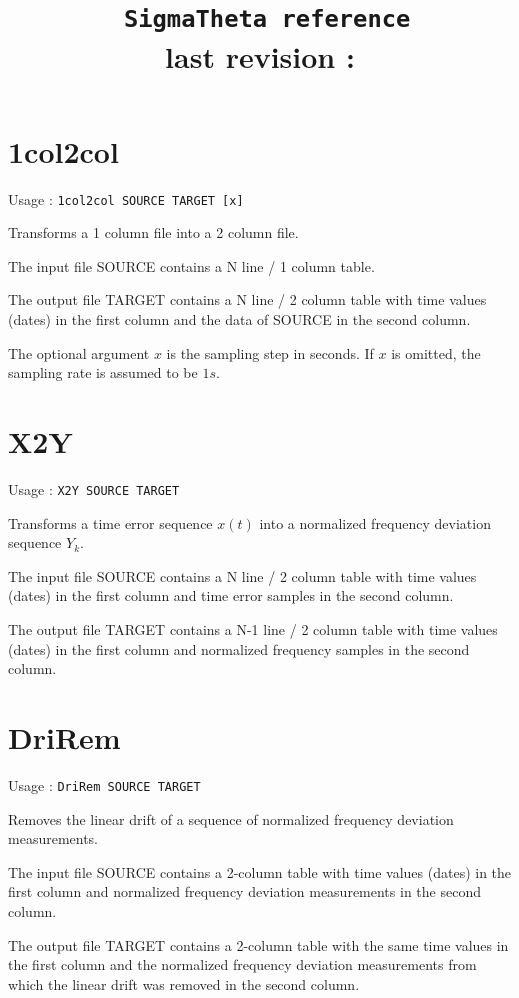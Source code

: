\documentclass[12pt,a4paper,french]{article}
\title {
    {\LARGE{\tt{\textbf{
SigmaTheta reference \\
}}}}
{\small{last revision : \revdate}}
}
\author{}
\date{}
\begin{document}
\maketitle 
\section{ 1col2col}

Usage : {\tt{1col2col SOURCE TARGET [x]}}

Transforms a 1 column file into a 2 column file.

The input file SOURCE contains a N line / 1 column table.

The output file TARGET contains a N line / 2 column table with time values (dates) in the first column and the data of SOURCE in the second column.

The optional argument $x$ is the sampling step in seconds. If $x$ is omitted, the sampling rate is assumed to be $1 s$.

\section{ X2Y}

Usage : {\tt{X2Y SOURCE TARGET}}

Transforms a time error sequence $x(t)$ into a normalized frequency deviation sequence $Y_k$.

The input file SOURCE contains a N line / 2 column table with time values (dates) in the first column and time error samples in the second column.

The output file TARGET contains a N-1 line / 2 column table with time values (dates) in the first column and normalized frequency samples in the second column.

\section{DriRem}

Usage : {\tt{DriRem SOURCE TARGET}}

Removes the linear drift of a sequence of normalized frequency deviation measurements.

The input file SOURCE contains a 2-column table with time values (dates) in the first column and normalized frequency deviation measurements in the second column.

The output file TARGET contains a 2-column table with the same time values in the first column and the normalized frequency deviation measurements from which the linear drift was removed in the second column.
\end{document}
